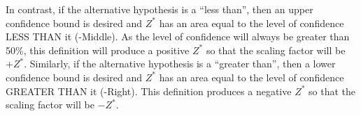 \documentclass[10pt,openany]{book}\usepackage[]{graphicx}\usepackage[]{color}
\begin{document}
In contrast, if the alternative hypothesis is a ``less than'', then an upper confidence bound is desired and $Z^{*}$ has an area equal to the level of confidence LESS THAN it (-Middle).  As the level of confidence will always be greater than 50\%, this definition will produce a positive $Z^{*}$ so that the scaling factor will be $+Z^{*}$.  Similarly, if the alternative hypothesis is a ``greater than'', then a lower confidence bound is desired and $Z^{*}$ has an area equal to the level of confidence GREATER THAN it (-Right).  This definition produces a negative $Z^{*}$ so that the scaling factor will be $-Z^{*}$.


\vspace{-12pt}
\end{document}
